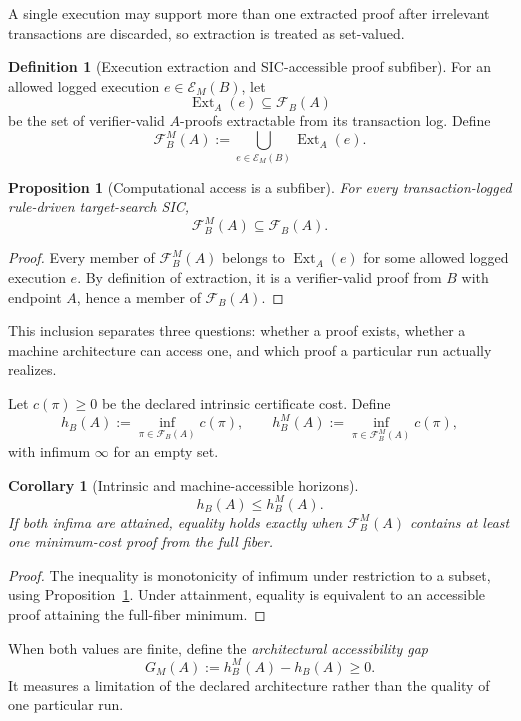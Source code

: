 \documentclass[11pt]{article}
\newtheorem{corollary}[theorem]{Corollary}
\newtheorem{proposition}[theorem]{Proposition}
\theoremstyle{definition}
\newtheorem{definition}[theorem]{Definition}
\newcommand{\Fib}{\mathcal F}
\newcommand{\Run}{\mathcal E}
\begin{document}
A single execution may support more than one extracted proof after irrelevant transactions are discarded, so extraction is treated as set-valued.

\begin{definition}[Execution extraction and SIC-accessible proof subfiber]
For an allowed logged execution $e\in\Run_M(B)$, let
\[
\operatorname{Ext}_A(e)\subseteq\Fib_B(A)
\]
be the set of verifier-valid $A$-proofs extractable from its transaction log.  Define
\[
\boxed{
\Fib_B^M(A):=\bigcup_{e\in\Run_M(B)}\operatorname{Ext}_A(e).
}
\]
\end{definition}

\begin{proposition}[Computational access is a subfiber]\label{prop:subfiber}
For every transaction-logged rule-driven target-search SIC,
\[
\boxed{\Fib_B^M(A)\subseteq\Fib_B(A).}
\]
\end{proposition}

\begin{proof}
Every member of $\Fib_B^M(A)$ belongs to $\operatorname{Ext}_A(e)$ for some allowed logged execution $e$.  By definition of extraction, it is a verifier-valid proof from $B$ with endpoint $A$, hence a member of $\Fib_B(A)$.
\end{proof}

This inclusion separates three questions: whether a proof exists, whether a machine architecture can access one, and which proof a particular run actually realizes.

Let $c(\pi)\ge0$ be the declared intrinsic certificate cost.  Define
\[
h_B(A):=\inf_{\pi\in\Fib_B(A)}c(\pi),
\qquad
h_B^M(A):=\inf_{\pi\in\Fib_B^M(A)}c(\pi),
\]
with infimum $\infty$ for an empty set.

\begin{corollary}[Intrinsic and machine-accessible horizons]\label{cor:sic-access-horizon}
\[
\boxed{h_B(A)\le h_B^M(A).}
\]
If both infima are attained, equality holds exactly when $\Fib_B^M(A)$ contains at least one minimum-cost proof from the full fiber.
\end{corollary}

\begin{proof}
The inequality is monotonicity of infimum under restriction to a subset, using Proposition~\ref{prop:subfiber}.  Under attainment, equality is equivalent to an accessible proof attaining the full-fiber minimum.
\end{proof}

When both values are finite, define the \emph{architectural accessibility gap}
\[
\boxed{G_M(A):=h_B^M(A)-h_B(A)\ge0.}
\]
It measures a limitation of the declared architecture rather than the quality of one particular run.
\end{document}
